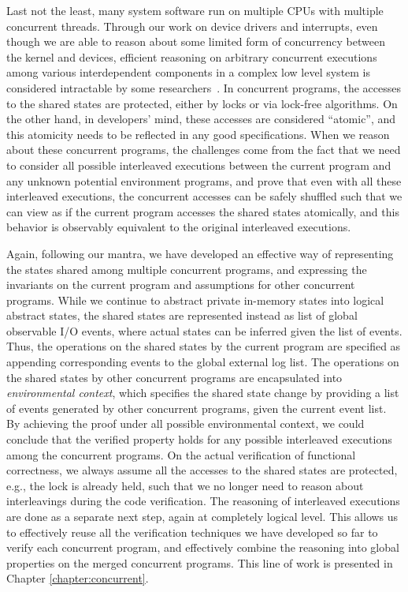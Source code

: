 Last not the least, many system software run on multiple CPUs with
multiple concurrent threads.   
Through our work on device drivers and interrupts, even though
we are able to reason about some limited form of concurrency between the kernel and
devices, efficient reasoning on arbitrary concurrent executions among various
interdependent components in a complex low level system is considered
intractable by some researchers~\cite{vontessin13,peters15}. 
In concurrent programs, the accesses to the shared states are protected, either by
locks or via lock-free algorithms. On the other hand, in developers' mind, these accesses
are considered ``atomic'', and this atomicity needs to be reflected in any good specifications.
When we reason about these concurrent programs, the challenges come from the fact
that we need to consider all possible interleaved executions between the current program
and any unknown potential environment programs, and prove that even with all these interleaved
executions, the concurrent accesses can be safely shuffled such that we can view as if
the current program accesses the shared states atomically, and this behavior is observably
equivalent to the original interleaved executions.

Again, following our mantra, we have developed an effective way of representing the states
shared among multiple concurrent programs, and expressing the invariants on the current program
and assumptions for other concurrent programs. While we continue to abstract private in-memory
states into logical abstract states, the shared states are represented instead as list of global
observable I/O events, where actual states can be inferred given the list of events. Thus, the operations
on the shared states by the current program are specified as appending corresponding events to the
global external log list. The operations on the shared states by other concurrent programs are encapsulated
into {\it environmental context}, which specifies the shared state change by providing a list of events
generated by other concurrent programs, given the current event list.
By achieving the proof under all possible environmental context, we could conclude that
the verified property holds for any possible interleaved executions among the concurrent programs.
On the actual verification of functional correctness, we always assume all the accesses to the shared
states are protected, e.g., the lock is already held, such that we no longer need to reason about interleavings
during the code verification. The reasoning of interleaved executions are done as a separate next step,
again at completely logical level.
This allows us to effectively reuse all the
verification techniques we have developed so far to verify each concurrent program, and effectively
combine the reasoning into global properties on the merged concurrent programs.
This line of work is presented in Chapter \ref{chapter:concurrent}.

